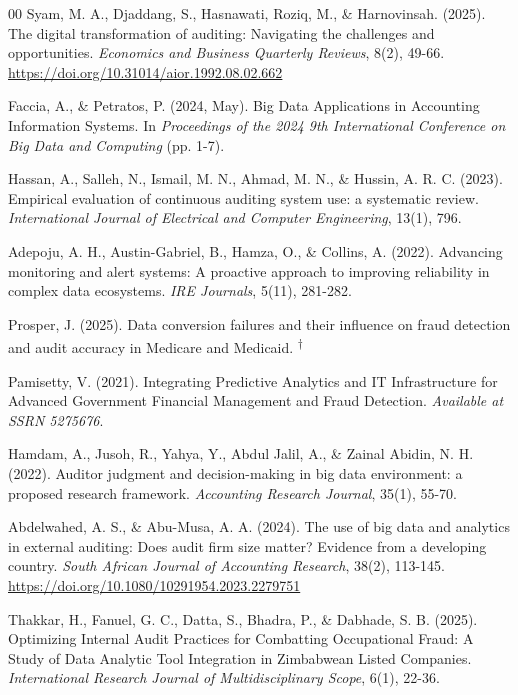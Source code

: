 \documentclass[conference]{IEEEtran}
\newcommand{\rvr}{\textsuperscript{$\dagger$}}
\begin{document}
\begin{thebibliography}{00}
 Syam, M. A., Djaddang, S., Hasnawati, Roziq, M., \& Harnovinsah. (2025). The digital transformation of auditing: Navigating the challenges and opportunities. \emph{Economics and Business Quarterly Reviews}, 8(2), 49-66. \url{https://doi.org/10.31014/aior.1992.08.02.662}

 Faccia, A., \& Petratos, P. (2024, May). Big Data Applications in Accounting Information Systems. In \emph{Proceedings of the 2024 9th International Conference on Big Data and Computing} (pp. 1-7).

 Hassan, A., Salleh, N., Ismail, M. N., Ahmad, M. N., \& Hussin, A. R. C. (2023). Empirical evaluation of continuous auditing system use: a systematic review. \emph{International Journal of Electrical and Computer Engineering}, 13(1), 796.

 Adepoju, A. H., Austin-Gabriel, B., Hamza, O., \& Collins, A. (2022). Advancing monitoring and alert systems: A proactive approach to improving reliability in complex data ecosystems. \emph{IRE Journals}, 5(11), 281-282.

 Prosper, J. (2025). Data conversion failures and their influence on fraud detection and audit accuracy in Medicare and Medicaid. \rvr

 Pamisetty, V. (2021). Integrating Predictive Analytics and IT Infrastructure for Advanced Government Financial Management and Fraud Detection. \emph{Available at SSRN 5275676}.

 Hamdam, A., Jusoh, R., Yahya, Y., Abdul Jalil, A., \& Zainal Abidin, N. H. (2022). Auditor judgment and decision-making in big data environment: a proposed research framework. \emph{Accounting Research Journal}, 35(1), 55-70.

 Abdelwahed, A. S., \& Abu-Musa, A. A. (2024). The use of big data and analytics in external auditing: Does audit firm size matter? Evidence from a developing country. \emph{South African Journal of Accounting Research}, 38(2), 113-145. \url{https://doi.org/10.1080/10291954.2023.2279751}

 Thakkar, H., Fanuel, G. C., Datta, S., Bhadra, P., \& Dabhade, S. B. (2025). Optimizing Internal Audit Practices for Combatting Occupational Fraud: A Study of Data Analytic Tool Integration in Zimbabwean Listed Companies. \emph{International Research Journal of Multidisciplinary Scope}, 6(1), 22-36.


\end{thebibliography}
\end{document}
